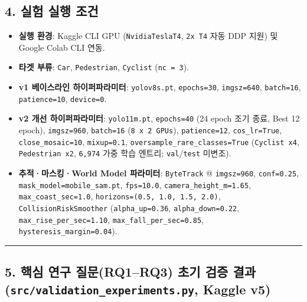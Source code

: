 \documentclass[10.5pt,a4paper]{article}
\begin{document}
\subsection{4. 실험 실행 조건}

\begin{itemize}[leftmargin=1.5em,itemsep=2pt]
\item \textbf{실행 환경}: Kaggle CLI GPU (\texttt{NvidiaTeslaT4}, \texttt{2x T4} 자동 DDP 지원) 및 Google Colab CLI 연동.
\item \textbf{타겟 부류}: \texttt{Car}, \texttt{Pedestrian}, \texttt{Cyclist} (\texttt{nc = 3}).
\item \textbf{v1 베이스라인 하이퍼파라미터}: \texttt{yolov8s.\allowbreak{}pt}, \texttt{epochs=30}, \texttt{imgsz=640}, \texttt{batch=16}, \texttt{patience=10}, \texttt{device=0}.
\item \textbf{v2 개선 하이퍼파라미터}: \texttt{yolo11m.\allowbreak{}pt}, \texttt{epochs=40} (24 epoch 조기 종료, Best 12 epoch), \texttt{imgsz=960}, \texttt{batch=16} (\texttt{8 x 2 GPUs}), \texttt{patience=12}, \texttt{cos\_\allowbreak{}lr=True}, \texttt{close\_\allowbreak{}mosaic=10}, \texttt{mixup=0.\allowbreak{}1}, \texttt{oversample\_\allowbreak{}rare\_\allowbreak{}classes=True} (\texttt{Cyclist x4}, \texttt{Pedestrian x2}, \texttt{6,\allowbreak{}974} 가중 학습 엔트리; \texttt{val}/\texttt{test} 미변조).
\item \textbf{추적·마스킹·World Model 파라미터}: \texttt{ByteTrack} @ \texttt{imgsz=960}, \texttt{conf=0.\allowbreak{}25}, \texttt{mask\_\allowbreak{}model=mobile\_\allowbreak{}sam.\allowbreak{}pt}, \texttt{fps=10.\allowbreak{}0}, \texttt{camera\_\allowbreak{}height\_\allowbreak{}m=1.\allowbreak{}65}, \texttt{max\_\allowbreak{}coast\_\allowbreak{}sec=1.\allowbreak{}0}, \texttt{horizons=(0.\allowbreak{}5,\allowbreak{} 1.\allowbreak{}0,\allowbreak{} 1.\allowbreak{}5,\allowbreak{} 2.\allowbreak{}0)}, \texttt{CollisionRiskSmoother} (\texttt{alpha\_\allowbreak{}up=0.\allowbreak{}36}, \texttt{alpha\_\allowbreak{}down=0.\allowbreak{}22}, \texttt{max\_\allowbreak{}rise\_\allowbreak{}per\_\allowbreak{}sec=1.\allowbreak{}10}, \texttt{max\_\allowbreak{}fall\_\allowbreak{}per\_\allowbreak{}sec=0.\allowbreak{}85}, \texttt{hysteresis\_\allowbreak{}margin=0.\allowbreak{}04}).
\end{itemize}

\par\noindent\rule{\textwidth}{0.4pt}\par\medskip

\subsection{5. 핵심 연구 질문(RQ1--RQ3) 초기 검증 결과 (\texttt{src/\allowbreak{}validation\_\allowbreak{}experiments.\allowbreak{}py}, Kaggle v5)}
\end{document}
